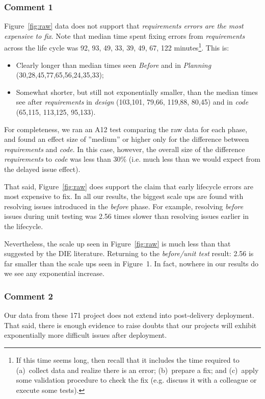 \documentclass{sig-alternate}
\newcommand{\bi}{\begin{itemize}}%
\newcommand{\ei}{\end{itemize}}
\begin{document}
\subsubsection{Comment 1}
Figure~\ref{fig:raw}
 data does not support that   
{\em  requirements errors are the most expensive to fix}.
Note that   median time spent fixing errors from {\em requirements} across the life cycle was 92, 93,  49, 33, 39, 49, 67, 122 minutes\footnote{If this time seems long, then recall
that it includes the time required  to (a)~collect data and realize there is an error;
(b)~prepare a fix;  and (c)~apply some validation
procedure to check the fix (e.g. discuss it with a colleague or execute some tests).}.
This is:
\bi
\item
Clearly longer than median times seen {\em Before } and in {\em Planning}
(30,28,45,77,65,56,24,35,33);
\item
Somewhat shorter, but still not exponentially smaller,  than the median times see after {\em requirements} in {\em design}
(103,101, 79,66, 119,88, 80,45) and in {\em code} (65,115, 113,125, 95,133). 
\ei
For completeness, we ran an A12 test comparing the raw data for each phase, and found an effect size of ''medium'' or higher only for the difference between {\em requirements}
and {\em code}. In this case, however, 
 the overall size of the difference
{\em requirements} to {\em code} was less than 30\% (i.e. much less than we would
expect from the delayed issue effect). 

That said, Figure~\ref{fig:raw} does support the 
claim that early lifecycle errors are most expensive to fix.
In all our results, the biggest scale ups are found with resolving
issues introduced in the {\em before} phase. For example,
resolving {\em before} issues during unit testing was 2.56 times
slower than resolving issues earlier in the lifecycle. 

Nevertheless, the scale up seen in 
Figure~\ref{fig:raw} 
is much less
than that suggested by the DIE literature. Returning to
the {\em before/unit test} result: 2.56 is far smaller
than the scale ups seen in Figure~1. In fact, nowhere in 
our results do we see any exponential increase.

\newpage\subsubsection{Comment 2}
Our data from these 171 project does not extend into post-delivery deployment. That said,
there is enough evidence to raise doubts that our projects will exhibit exponentially more
difficult issues after deployment. 
\end{document}
